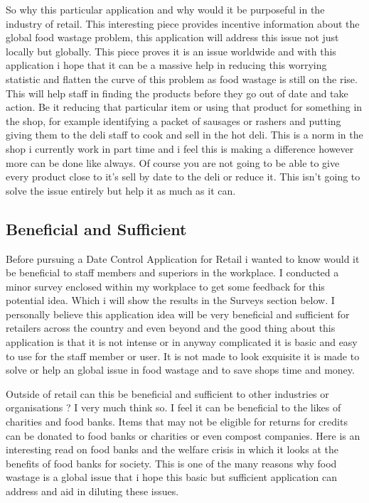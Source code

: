 So why this particular application and why would it be purposeful in the industry of retail. This interesting piece \cite{gustavsson2011global} provides incentive information about the global food wastage problem, this application will address this issue not just locally but globally. This piece proves it is an issue worldwide and with this application i hope that it can be a massive help in reducing this worrying statistic and flatten the curve of this problem as food wastage is still on the rise. This will help staff in finding the products before they go out of date and take action. Be it reducing that particular item or using that product for something in the shop, for example identifying a packet of sausages or rashers and putting giving them to the deli staff to cook and sell in the hot deli. This is a norm in the shop i currently work in part time and i feel this is making a difference however more can be done like always. Of course you are not going to be able to give every product close to it's sell by date to the deli or reduce it. This isn't going to solve the issue entirely but help it as much as it can. 

\subsection{Beneficial and Sufficient}
Before pursuing a Date Control Application for Retail i wanted to know would it be beneficial to staff members and superiors in the workplace. I conducted a minor survey enclosed within my workplace to get some feedback for this potential idea. Which i will show the results in the Surveys section below. I personally believe this application idea will be very beneficial and sufficient for retailers across the country and even beyond and the good thing about this application is that it is not intense or in anyway complicated it is basic and easy to use for the staff member or user. It is not made to look exquisite it is made to solve or help an global issue in food wastage and to save shops time and money.
\newline

Outside of retail can this be beneficial and sufficient to other industries or organisations ? I very much think so. I feel it can be beneficial to the likes of charities and food banks. Items that may not be eligible for returns for credits can be donated to food banks or charities or even compost companies. \cite{riches1986food} Here is an interesting read on food banks and the welfare crisis in which it looks at the benefits of food banks for society. This is one of the many reasons why food wastage is a global issue that i hope this basic but sufficient application can address and aid in diluting these issues. 
\newline

